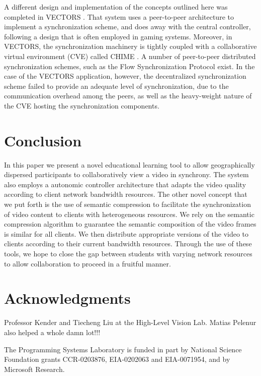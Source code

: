 \documentclass{sig-alternate}
\begin{document}
A different design and implementation of the concepts outlined here
was completed in VECTORS \cite{VECTORS}.  That system uses a
peer-to-peer architecture to implement a synchronization scheme, and
does away with the central controller, following a design that is
often employed in gaming systems.  Moreover, in VECTORS, the
synchronization machinery is tightly coupled with a collaborative
virtual environment (CVE) called CHIME \cite{CHIME}.  A number of
peer-to-peer distributed synchronization schemes, such as the Flow
Synchronization Protocol \cite{FSP} exist.  In the case of the VECTORS
application, however, the decentralized synchronization scheme failed
to provide an adequate level of synchronization, due to the
communication overhead among the peers, as well as the heavy-weight
nature of the CVE hosting the synchronization components.

\section{Conclusion}

In this paper we present a novel educational learning tool to allow
geographically dispersed participants to collaboratively view a video
in synchrony.  The system also employs a autonomic controller
architecture that adapts the video quality according to client network
bandwidth resources.  The other novel concept that we put forth is the
use of semantic compression to facilitate the synchronization of
video content to clients with heterogeneous resources.  We rely on the
semantic compression algorithm to guarantee the semantic composition
of the video frames is similar for all clients.  We then distribute
appropriate versions of the video to clients according to their
current bandwidth resources.  Through the use of these tools, we hope
to close the gap between students with varying network resources to
allow collaboration to proceed in a fruitful manner.

\section{Acknowledgments}
Professor Kender and Tiecheng Liu at the High-Level Vision Lab.
Matias Pelenur also helped a whole damn lot!!!

The Programming Systems Laboratory is funded in part by National
Science Foundation grants CCR-0203876, EIA-0202063 and EIA-0071954,
and by Microsoft Research.




\end{document}
